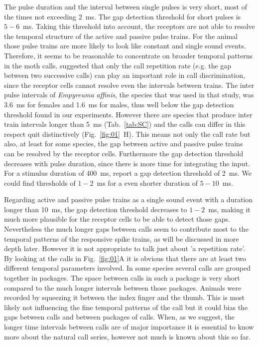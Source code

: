 \documentclass[12pt,a4paper,pdftex]{article}
\newcommand{\species}[1]{\textit{#1}}
\newcommand{\fig}[2]{(Fig.~#1~#2)}
\begin{document}
The pulse duration and the interval between single pulses is very short, most of the times not exceeding 2~ms. The gap detection threshold for short pulses is $5-6$~ms. Taking this threshold into account, the receptors are not able to resolve the temporal structure of the active and passive pulse trains. For the animal those pulse trains are more likely to look like constant and single sound events. Therefore, it seems to be reasonable to concentrate on broader temporal patterns in the moth calls. \cite{sanderford1998} suggested that only the call repetition rate (e.g. the gap between two successive calls) can play an important role in call discrimination, since the receptor cells cannot resolve even the intervals between trains. The inter pulse intervals of \species{Empyreuma affinis}, the species that was used in that study, was 3.6~ms for females and 1.6~ms for males, thus well below the gap detection threshold found in our experiments. However there are species that produce inter train intervals longer than 5~ms (Tab.~\ref{tab:SC}) and the calls can differ in this respect quit distinctively \fig{\ref{fig:01}}{H}. This means not only the call rate but also, at least for some species, the gap between active and passive pulse trains can be resolved by the receptor cells. Furthermore the gap detection threshold decreases with pulse duration, since there is more time for integrating the input. For a stimulus duration of 400~ms, \cite{surlykke1988} report a gap detection threshold of 2~ms. We could find thresholds of $1-2$~ms for a even shorter duration of $5-10$~ms.

Regarding active and passive pulse trains as a single sound event with a duration longer than 10~ms, the gap detection threshold decreases to $1-2$~ms, making it much more plausible for the receptor cells to be able to detect those gaps. Nevertheless the much longer gaps between calls seem to contribute most to the temporal patterns of the responsive spike trains, as will be discussed in more depth later. However it is not appropriate to talk just about 'a repetition rate'. By looking at the calls in Fig.~\ref{fig:01}{A} it is obvious that there are at least two different temporal parameters involved. In some species several calls are grouped together in packages. The space between calls in such a package is very short compared to the much longer intervals between those packages. Animals were recorded by squeezing it between the index finger and the thumb. This is most likely not influencing the fine temporal patterns of the call but it could bias the gaps between calls and between packages of calls. When, as we suggest, the longer time intervals between calls are of major importance it is essential to know more about the natural call series, however not much is known about this so far.
\end{document}
